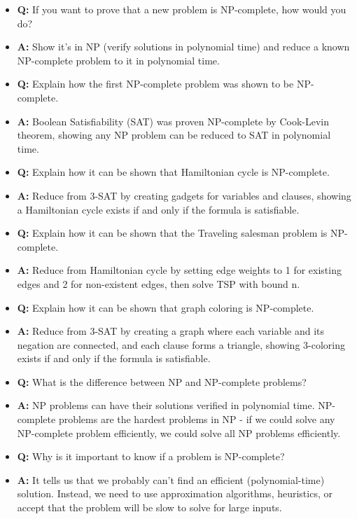 \documentclass[11pt,a4paper]{article}
\begin{document}
\begin{multicols}{2}
\begin{itemize}
    \item \textbf{Q:} If you want to prove that a new problem is NP-complete, how would you do?
    \item \textbf{A:} Show it's in NP (verify solutions in polynomial time) and reduce a known NP-complete problem to it in polynomial time.

    \item \textbf{Q:} Explain how the first NP-complete problem was shown to be NP-complete.
    \item \textbf{A:} Boolean Satisfiability (SAT) was proven NP-complete by Cook-Levin theorem, showing any NP problem can be reduced to SAT in polynomial time.

    \item \textbf{Q:} Explain how it can be shown that Hamiltonian cycle is NP-complete.
    \item \textbf{A:} Reduce from 3-SAT by creating gadgets for variables and clauses, showing a Hamiltonian cycle exists if and only if the formula is satisfiable.

    \item \textbf{Q:} Explain how it can be shown that the Traveling salesman problem is NP-complete.
    \item \textbf{A:} Reduce from Hamiltonian cycle by setting edge weights to 1 for existing edges and 2 for non-existent edges, then solve TSP with bound n.

    \item \textbf{Q:} Explain how it can be shown that graph coloring is NP-complete.
    \item \textbf{A:} Reduce from 3-SAT by creating a graph where each variable and its negation are connected, and each clause forms a triangle, showing 3-coloring exists if and only if the formula is satisfiable.

    \item \textbf{Q:} What is the difference between NP and NP-complete problems?
    \item \textbf{A:} NP problems can have their solutions verified in polynomial time. NP-complete problems are the hardest problems in NP - if we could solve any NP-complete problem efficiently, we could solve all NP problems efficiently.

    \item \textbf{Q:} Why is it important to know if a problem is NP-complete?
    \item \textbf{A:} It tells us that we probably can't find an efficient (polynomial-time) solution. Instead, we need to use approximation algorithms, heuristics, or accept that the problem will be slow to solve for large inputs.


\end{itemize}
\end{multicols}
\end{document}
